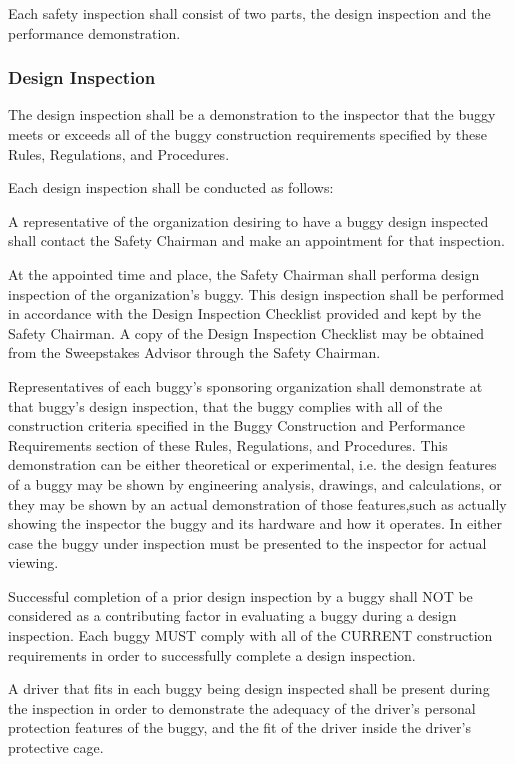 \documentclass[openany]{book}
\begin{document}
Each safety inspection shall consist of two parts, the design inspection and the performance demonstration.

\subsubsection{Design Inspection}

The design inspection shall be a demonstration to the inspector that the buggy meets or exceeds all of the buggy construction requirements specified by these Rules, Regulations, and Procedures.

Each design inspection shall be conducted as follows:

A representative of the organization desiring to have a buggy design inspected shall contact the Safety Chairman and make an appointment for that inspection.

At the appointed time and place, the Safety Chairman shall performa design inspection of the organization's buggy. This design inspection shall be performed in accordance with the Design Inspection Checklist provided and kept by the Safety Chairman. A copy of the Design Inspection Checklist may be obtained from the Sweepstakes Advisor through the Safety Chairman.

Representatives of each buggy's sponsoring organization shall demonstrate at that buggy's design inspection, that the buggy complies with all of the construction criteria specified in the Buggy Construction and Performance Requirements section of these Rules, Regulations, and Procedures. This demonstration can be either theoretical or experimental, i.e. the design features of a buggy may be shown by engineering analysis, drawings, and calculations, or they may be shown by an actual demonstration of those features,such as actually showing the inspector the buggy and its hardware and how it operates. In either case the buggy under inspection must be presented to the inspector for actual viewing.

Successful completion of a prior design inspection by a buggy shall NOT be considered as a contributing factor in evaluating a buggy during a design inspection. Each buggy MUST comply with all of the CURRENT construction requirements in order to successfully complete a design inspection.

A driver that fits in each buggy being design inspected shall be present during the inspection in order to demonstrate the adequacy of the driver's personal protection features of the buggy, and the fit of the driver inside the driver's protective cage.
\end{document}

